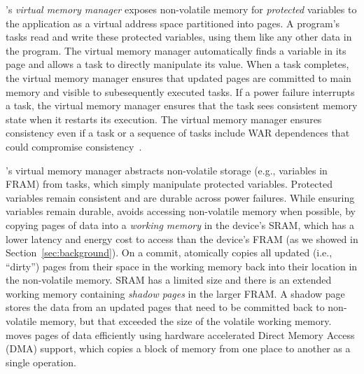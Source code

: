 
\sys's {\em virtual memory manager} exposes non-volatile memory for
\emph{protected} variables to the application as a virtual address space
partitioned into pages.  
%
A program's tasks read and write these protected variables, using them like any
other data in the program. 
%
The virtual memory manager automatically finds a variable in its page and  
allows a task to directly manipulate its value.
%
When a task completes, the virtual memory manager ensures that updated pages 
are committed to main memory and visible to subesequently executed tasks.
%
If a power failure interrupts a task, the virtual memory manager ensures that
the task sees consistent memory state when it restarts its execution. 
%
The virtual memory manager ensures consistency even if a task or a sequence of tasks include WAR dependences that could compromise consistency~\cite{ratchet,dino}.
%
%
%
%

\sys's virtual memory manager \sys abstracts non-volatile storage (e.g.,
variables in FRAM) from tasks, which simply manipulate protected variables.
%
Protected variables remain consistent and are durable across power failures.
%
While ensuring variables remain durable, \sys avoids accessing non-volatile
memory when possible, by copying pages of data into a {\em working memory} in the device's SRAM, which
has a lower latency and energy cost to access than the device's FRAM (as we
showed in Section~\ref{sec:background}).
%
%
On a commit, \sys atomically copies all updated (i.e., ``dirty'') pages from their
space in the working memory back into their location in the non-volatile
memory.
%
SRAM has a limited size and there is an extended working memory containing {\em
shadow pages} in the larger FRAM.  A shadow page stores the data from an
updated pages that need to be committed back to non-volatile memory, but that
exceeded the size of the volatile working memory. 
%
\sys moves pages of data efficiently using hardware accelerated Direct Memory
Access (DMA) support, which copies a block of memory from one place to another
as a single operation. 


